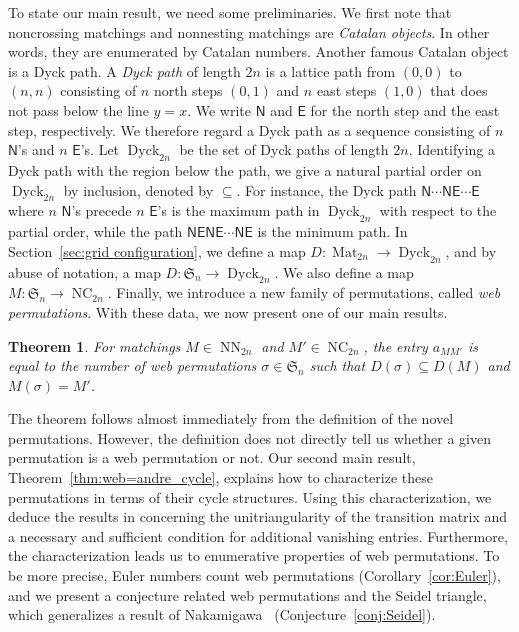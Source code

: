 \documentclass[reqno,12pt]{amsart}
\newtheorem{thm}{Theorem}[section]
\theoremstyle{definition}
\theoremstyle{remark}
\newcommand\Dyck{\operatorname{Dyck}}
\newcommand\NC{\operatorname{NC}}
\newcommand\NN{\operatorname{NN}}
\newcommand\Mat{\operatorname{Mat}}
\newcommand\NS{\mathsf{N}}
\newcommand\ES{\mathsf{E}}
\newcommand\SYM{\mathfrak{S}}
\begin{document}
To state our main result, we need some preliminaries.
We first note that noncrossing matchings and nonnesting matchings are \emph{Catalan objects}.
In other words, they are enumerated by Catalan numbers.
Another famous Catalan object is a Dyck path.
A \emph{Dyck path} of length \( 2n \)  is a lattice path from \( (0,0) \)
to \( (n,n) \) consisting of \( n \) north steps \( (0,1) \) and
\( n \) east steps \( (1,0) \) that does not pass below the line \( y=x \).
We write \( \NS \) and \( \ES \) for the north step and the east step,
respectively.
We therefore regard a Dyck path as a sequence consisting of
\( n \) \( \NS \)'s and \( n \) \( \ES \)'s.
Let \( \Dyck_{2n} \) be the set of Dyck paths of length \( 2n \).
Identifying a Dyck path with the region below the path,
we give a natural partial order on \( \Dyck_{2n} \) by inclusion,
denoted by \( \subseteq \).
For instance, the Dyck path \( \NS\cdots\NS\ES\cdots\ES \) where
\( n \) \( \NS \)'s precede \( n \) \( \ES \)'s is the maximum path
in \( \Dyck_{2n} \) with respect to the partial order,
while the path \( \NS\ES\NS\ES\cdots\NS\ES \) is the minimum path.
In Section~\ref{sec:grid configuration}, we define a map
\( D:\Mat_{2n}\rightarrow \Dyck_{2n} \), and by abuse of notation,
a map \( D:\SYM_n\rightarrow \Dyck_{2n} \).
We also define a map \( M:\SYM_n\rightarrow \NC_{2n} \).
Finally, we introduce a new family of permutations,
called \emph{web permutations}. With these data, we now present one of our main
results.
\begin{thm} \label{thm:main_intro}
  For matchings \( M\in\NN_{2n} \) and \( M'\in\NC_{2n} \),
  the entry \( a_{MM'} \) is equal to the number of web permutations
  \( \sigma\in\SYM_n \) such that \( D(\sigma)\subseteq D(M) \) and \(M(\sigma)=M'\).
\end{thm}

The theorem follows almost immediately from the definition of the novel
permutations.
However, the definition does not directly tell us whether a given permutation
is a web permutation or not.
Our second main result, Theorem~\ref{thm:web=andre_cycle}, 
explains how to characterize these permutations in terms of their cycle structures.
Using this characterization, we deduce the results in \cite{RT19,IZ22}
concerning the unitriangularity of the transition matrix and a necessary
and sufficient condition for additional vanishing entries.
Furthermore, the characterization leads us to enumerative properties of web
permutations.
To be more precise, Euler numbers count web permutations (Corollary~\ref{cor:Euler}), and we present
a conjecture related web permutations and the Seidel triangle, which generalizes
a result of Nakamigawa~\cite{Nak20} (Conjecture~\ref{conj:Seidel}).
\end{document}
